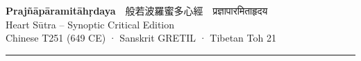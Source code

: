 \documentclass[9pt,a4paper]{article}
\newcommand{\deva}[1]{{\devanagarifont #1}}
\begin{document}

\begin{center}
{\Large\bfseries Prajñāpāramitāhṛdaya}~~般若波羅蜜多心經~~\deva{प्रज्ञापारमिताहृदय}\\[0.3em]
{\large Heart Sūtra -- Synoptic Critical Edition}\\[0.2em]
{\small Chinese T251 (649 CE) · Sanskrit GRETIL · Tibetan Toh 21}
\end{center}

\vspace{0.5em}
\hrule
\vspace{0.5em}


\footnotesize
\end{document}
